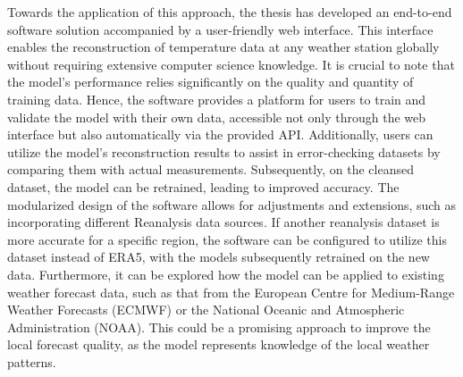 Towards the application of this approach, the thesis has developed an end-to-end software solution accompanied by a user-friendly web interface.
This interface enables the reconstruction of temperature data at any weather station globally without requiring extensive computer science knowledge.
It is crucial to note that the model's performance relies significantly on the quality and quantity of training data.
Hence, the software provides a platform for users to train and validate the model with their own data, accessible not only through the web interface but also automatically via the provided API.
Additionally, users can utilize the model's reconstruction results to assist in error-checking datasets by comparing them with actual measurements.
Subsequently, on the cleansed dataset, the model can be retrained, leading to improved accuracy.
The modularized design of the software allows for adjustments and extensions, such as incorporating different Reanalysis data sources.
If another reanalysis dataset is more accurate for a specific region, the software can be configured to utilize this dataset instead of ERA5, with the models subsequently retrained on the new data.
Furthermore, it can be explored how the model can be applied to existing weather forecast data, such as that from the European Centre for Medium-Range Weather Forecasts (ECMWF) or the National Oceanic and Atmospheric Administration (NOAA).
This could be a promising approach to improve the local forecast quality, as the model represents knowledge of the local weather patterns.